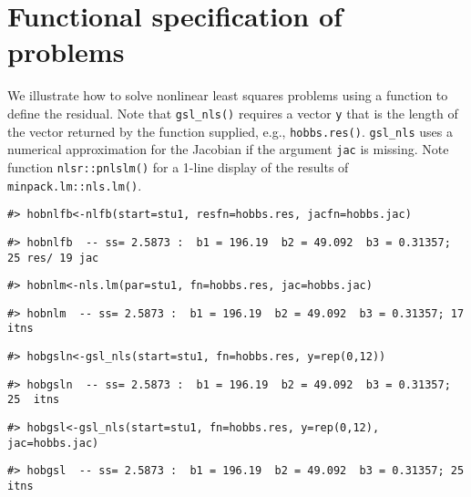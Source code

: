 \hypertarget{functional-specification-of-problems}{%
\section{Functional specification of problems}\label{functional-specification-of-problems}}

We illustrate how to solve nonlinear least squares problems using
a function to define the residual. Note that \texttt{gsl\_nls()} requires
a vector \texttt{y} that is the length of the vector returned by the
function supplied, e.g., \texttt{hobbs.res()}. \texttt{gsl\_nls} uses
a numerical approximation for the Jacobian if the argument \texttt{jac}
is missing. Note function \texttt{nlsr::pnlslm()} for a 1-line display of
the results of \texttt{minpack.lm::nls.lm()}.

\begin{verbatim}
#> hobnlfb<-nlfb(start=stu1, resfn=hobbs.res, jacfn=hobbs.jac)
\end{verbatim}

\begin{verbatim}
#> hobnlfb  -- ss= 2.5873 :  b1 = 196.19  b2 = 49.092  b3 = 0.31357; 25 res/ 19 jac
\end{verbatim}

\begin{verbatim}
#> hobnlm<-nls.lm(par=stu1, fn=hobbs.res, jac=hobbs.jac)
\end{verbatim}

\begin{verbatim}
#> hobnlm  -- ss= 2.5873 :  b1 = 196.19  b2 = 49.092  b3 = 0.31357; 17  itns
\end{verbatim}

\begin{verbatim}
#> hobgsln<-gsl_nls(start=stu1, fn=hobbs.res, y=rep(0,12))
\end{verbatim}

\begin{verbatim}
#> hobgsln  -- ss= 2.5873 :  b1 = 196.19  b2 = 49.092  b3 = 0.31357; 25  itns
\end{verbatim}

\begin{verbatim}
#> hobgsl<-gsl_nls(start=stu1, fn=hobbs.res, y=rep(0,12), jac=hobbs.jac)
\end{verbatim}

\begin{verbatim}
#> hobgsl  -- ss= 2.5873 :  b1 = 196.19  b2 = 49.092  b3 = 0.31357; 25  itns
\end{verbatim}

